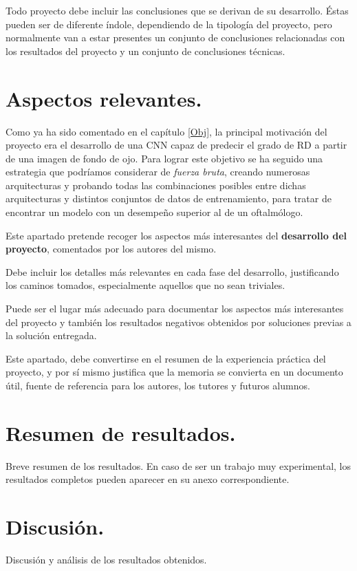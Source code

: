  \label{Conc}

Todo proyecto debe incluir las conclusiones que se derivan de su desarrollo. Éstas pueden ser de diferente índole, dependiendo de la tipología del proyecto, pero normalmente van a estar presentes un conjunto de conclusiones relacionadas con los resultados del proyecto y un conjunto de conclusiones técnicas. 

\section{Aspectos relevantes.}

Como ya ha sido comentado en el capítulo \ref{Obj}, la principal motivación del proyecto era el desarrollo de una CNN capaz de predecir el grado de RD a partir de una imagen de fondo de ojo. Para lograr este objetivo se ha seguido una estrategia que podríamos considerar de \textit{fuerza bruta}, creando numerosas arquitecturas y probando todas las combinaciones posibles entre dichas arquitecturas y distintos conjuntos de datos de entrenamiento, para tratar de encontrar un modelo con un desempeño superior al de un oftalmólogo. 

Este apartado pretende recoger los aspectos más interesantes del \textbf{desarrollo del proyecto}, comentados por los autores del mismo.

Debe incluir los detalles más relevantes en cada fase del desarrollo, justificando los caminos tomados, especialmente aquellos que no sean triviales. 

Puede ser el lugar más adecuado para documentar los aspectos más interesantes del proyecto y también los resultados negativos obtenidos por soluciones previas a la solución entregada.

Este apartado, debe convertirse en el resumen de la experiencia práctica del proyecto, y por sí mismo justifica que la memoria se convierta en un documento útil, fuente de referencia para los autores, los tutores y futuros alumnos.

\section{Resumen de resultados.}

Breve resumen de los resultados. En caso de ser un trabajo muy experimental, los resultados completos pueden aparecer en su anexo correspondiente.

\section{Discusión.}

Discusión y análisis de los resultados obtenidos.




